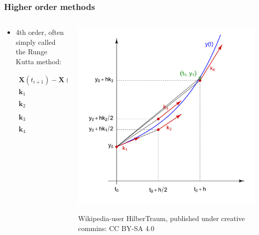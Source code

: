 \documentclass{beamer}
\begin{document}
\begin{frame}
\frametitle{Higher order methods}
\begin{columns}
\begin{column}{0.5\linewidth}
\begin{itemize}
\item<1-> 4th order, often simply called the Runge Kutta method:

\begin{align*}
\mathbf{X}(t_{i+1})-\mathbf{X}(t_{i}) &= \frac{h}{6}(\mathbf{k}_1+2\mathbf{k}_2+2\mathbf{k}_3+\mathbf{k}_4 )\\
\mathbf{k}_1 &= f_{ode}(\mathbf{X}(t_i),t_i)\\
\mathbf{k}_2 &= f_{ode}(\mathbf{X}(t_i)+\frac{h}{2}\mathbf{k}_1,t_i+\frac{h}{2})\\
\mathbf{k}_3 &= f_{ode}(\mathbf{X}(t_i)+\frac{h}{2}\mathbf{k}_2,t_i+\frac{h}{2})\\
\mathbf{k}_4 &= f_{ode}(\mathbf{X}(t_i)+h\mathbf{k}_3,t_i+h)
\end{align*}

\end{itemize}
\end{column}
\begin{column}{0.5\linewidth}
\includegraphics[width=\linewidth]{Runge-Kutta_slopes.pdf}

{\color{gray} Wikipedia-user HilberTraum, published under creative commins: CC BY-SA 4.0}
\end{column}
\end{columns}
\end{frame}
\end{document}
